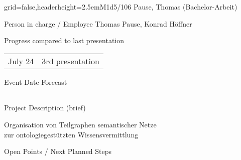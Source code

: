 \documentclass[english]{kiesgrube}
\begin{document}

\newpage

\begin{poster}{grid=false,headerheight=2.5em}{}{M1d5/106 Pause, Thomas (Bachelor-Arbeit)}{}{}
\begin{posterbox}[name=person,column=0,row=0]{Person in charge / Employee}
Thomas Pause, Konrad Höffner
\end{posterbox}
\begin{posterbox}[name=progress,below=person]{Progress compared to last presentation}
\begin{tabulary}{\textwidth}{lL}
July 24	&3rd presentation\\
\end{tabulary}
\end{posterbox}
\begin{posterbox}[name=event,below=progress]{Event Date Forecast}
\begin{tabulary}{\textwidth}{lL}
\end{tabulary}
\end{posterbox}
\begin{posterbox}[name=description,column=1,row=0]{Project Description (brief)}
\begin{center}
Organisation von Teilgraphen semantischer Netze\\
zur ontologiegestützten Wissensvermittlung
\end{center}
\end{posterbox}
\begin{posterbox}[name=open,column=1,below=description]{Open Points / Next Planned Steps}
\end{posterbox}

\end{poster}
\end{document}
